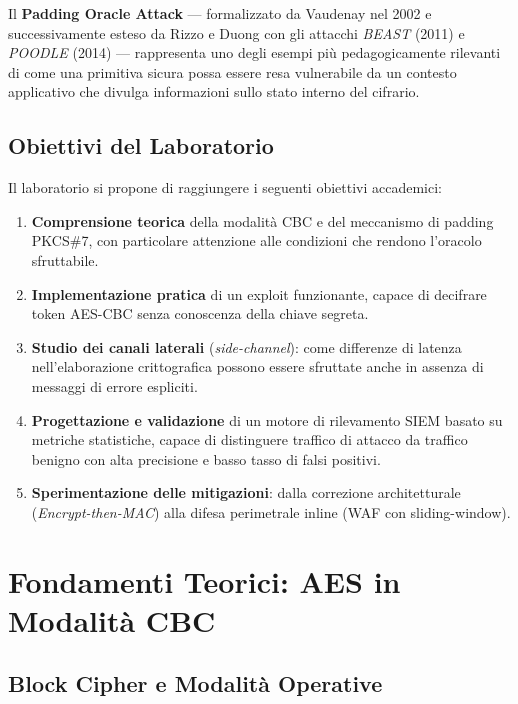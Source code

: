 \documentclass[12pt,a4paper]{article}
\begin{document}
Il \textbf{Padding Oracle Attack} — formalizzato da Vaudenay nel 2002 \cite{vaudenay2002} e
successivamente esteso da Rizzo e Duong con gli attacchi \emph{BEAST} (2011) e
\emph{POODLE} (2014) \cite{poodle2014} — rappresenta uno degli esempi più pedagogicamente
rilevanti di come una primitiva sicura possa essere resa vulnerabile da un contesto applicativo
che divulga informazioni sullo stato interno del cifrario.

\subsection{Obiettivi del Laboratorio}

Il laboratorio si propone di raggiungere i seguenti obiettivi accademici:

\begin{enumerate}[label=\textbf{O\arabic*.}]
  \item \textbf{Comprensione teorica} della modalità CBC e del meccanismo di padding PKCS\#7,
        con particolare attenzione alle condizioni che rendono l'oracolo sfruttabile.
  \item \textbf{Implementazione pratica} di un exploit funzionante, capace di decifrare token
        AES-CBC senza conoscenza della chiave segreta.
  \item \textbf{Studio dei canali laterali} (\emph{side-channel}): come differenze di latenza
        nell'elaborazione crittografica possono essere sfruttate anche in assenza di messaggi
        di errore espliciti.
  \item \textbf{Progettazione e validazione} di un motore di rilevamento SIEM basato su
        metriche statistiche, capace di distinguere traffico di attacco da traffico benigno
        con alta precisione e basso tasso di falsi positivi.
  \item \textbf{Sperimentazione delle mitigazioni}: dalla correzione architetturale
        (\emph{Encrypt-then-MAC}) alla difesa perimetrale inline (WAF con sliding-window).
\end{enumerate}

\section{Fondamenti Teorici: AES in Modalità CBC}

\subsection{Block Cipher e Modalità Operative}
\end{document}
